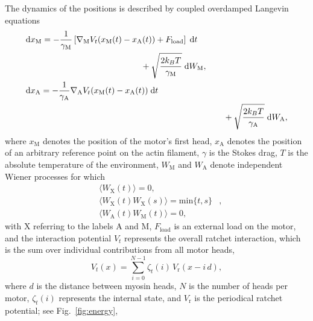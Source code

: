 \documentclass[aps,pre,twocolumn,showpacs,showkeys,superscriptaddress,floatfix]{revtex4-1}
\newcommand{\rmd}{{\mathrm d}}
\begin{document}
The dynamics of the positions is described by coupled overdamped Langevin equations 
\begin{align}
&\begin{multlined}[b]
\rmd x_\text{M} = 
- \frac{1}{\gamma_\text{M}} \left[ \nabla_\text{M} V_t(x_\text{M}(t) - x_\text{A}(t)) + F_\text{load} \right] \; \rmd t 
\\ 
+ \sqrt{ \frac{2 k_B T}{\gamma_\text{M}} } \; \rmd W_\text{M} ,
\end{multlined}
\label{eq:eom_M} \\
&\begin{multlined}[b][.9\linewidth]
\rmd x_\text{A} = 
- \frac{1}{\gamma_\text{A}} \nabla_\text{A} V_t(x_\text{M}(t) - x_\text{A}(t)) \; \rmd t 
\\
+ \sqrt{ \frac{2 k_B T}{\gamma_\text{A}} } \; \rmd W_\text{A} ,
\end{multlined}
\label{eq:eom_A}
\end{align}
where $x_\text{M}$ denotes the position of the motor's first head, 
$x_\text{A}$ denotes the position of an arbitrary reference point on the actin filament, 
$\gamma$ is the Stokes drag,
$T$ is the absolute temperature of the environment,
$W_\text{M}$ and $W_\text{A}$ denote independent Wiener processes
 for which
\begin{eqnarray*}
&\langle W_\text{X}(t)\rangle = 0,&\\
&\langle W_\text{X}(t)W_\text{X}(s)\rangle = \text{min}\{t,s\}& ,\\
&\langle W_\text{A}(t)W_\text{M}(t)\rangle = 0,&
\end{eqnarray*}
with $\text{X}$ referring to the labels $\text{A}$ and $\text{M}$, $F_\text{load}$ is an external load on the motor, 
and the interaction potential $V_t$ represents the overall ratchet interaction, 
which is the sum over individual contributions from all motor heads,
\begin{equation}
V_t(x) = \sum\limits_{i=0}^{N-1} \zeta_t(i) \, V_\text{r} (x - i \, d ), 
\label{eq:ratchet_interaction}
\end{equation}
where $d$ is the distance between myosin heads, 
$N$ is the number of heads per motor,
$\zeta_t(i)$ represents the internal state, 
and $V_\text{r}$ is the periodical ratchet potential; see Fig.~\ref{fig:energy},
\end{document}
